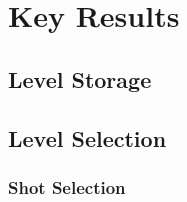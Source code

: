 \section{Key Results}

\subsection{Level Storage}


\subsection{Level Selection}


\subsubsection{Shot Selection}
